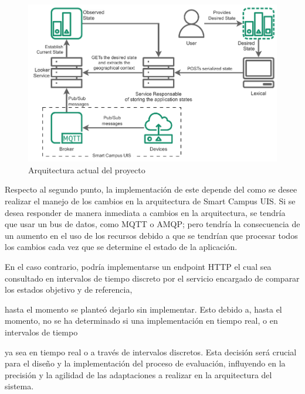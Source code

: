\begin{figure}[h]
    \centering
    \caption{Arquitectura actual del proyecto}
    \label{fig:StarDuckBasic}
    \includegraphics[width=\linewidth]{images/StarDuckBasic.pdf}
\end{figure}

Respecto al segundo punto, la implementación de este depende del como se desee realizar el manejo de los cambios en la arquitectura de Smart Campus UIS. Si se desea responder de manera inmediata a cambios en la arquitectura, se tendría que usar un bus de datos, como MQTT o AMQP; pero tendría la consecuencia de un aumento en el uso de los recursos debido a que se tendrían que procesar todos los cambios cada vez que se determine el estado de la aplicación. 

En el caso contrario, podría implementarse un endpoint HTTP el cual sea consultado en intervalos de tiempo discreto por el servicio encargado de comparar los estados objetivo y de referencia, 


hasta el momento se planteó dejarlo sin implementar. Esto debido a, hasta el momento, no se ha determinado si una implementación en tiempo real, o en intervalos de tiempo 


ya sea en tiempo real o a través de intervalos discretos. Esta decisión será crucial para el diseño y la implementación del proceso de evaluación, influyendo en la precisión y la agilidad de las adaptaciones a realizar en la arquitectura del sistema.

